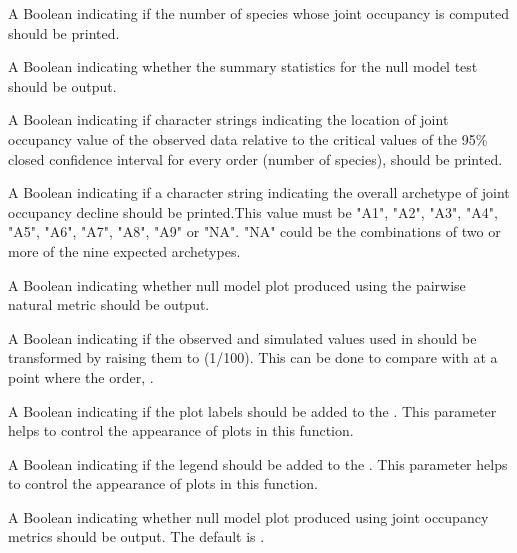 \documentclass[a4paper]{book}
\begin{document}
\begin{Arguments}
\begin{ldescription}
\item[\code{S.order}] A Boolean indicating if the number of species whose joint occupancy is computed
should be printed.

\item[\code{nmod\_stats}] A Boolean indicating whether the summary
statistics for the null model test should be output.

\item[\code{Pt\_Arch\_Vals}] A Boolean indicating if character strings indicating the location of
joint occupancy value of the observed data relative to the critical
values of the 95\% closed confidence interval for every order (number of species), should
be printed.

\item[\code{Atype}] A Boolean indicating if a character string indicating the overall archetype of
joint occupancy decline should be printed.This value must be \eqn{\in \{}{}"A1", "A2", "A3", "A4",
"A5", "A6", "A7", "A8", "A9"\eqn{\}}{} or "NA". "NA" could be the combinations of two or more
of the nine expected archetypes.

\item[\code{p.n.plot}] A Boolean indicating whether null model plot produced using the
pairwise natural metric should be output.

\item[\code{trans}] A Boolean indicating if the observed and simulated values used in
 should be transformed by raising them to (1/100). This can be done to
compare  with  at a point where the order, .

\item[\code{lab}] A Boolean indicating if the plot labels should be added to the . This parameter
helps to control the appearance of plots in this function.

\item[\code{leg}] A Boolean indicating if the legend should be added to the . This parameter
helps to control the appearance of plots in this function.

\item[\code{m.n.plot}] A Boolean indicating whether null model plot produced using joint
occupancy metrics should be output. The default is .
\end{ldescription}
\end{Arguments}
%
\end{document}
